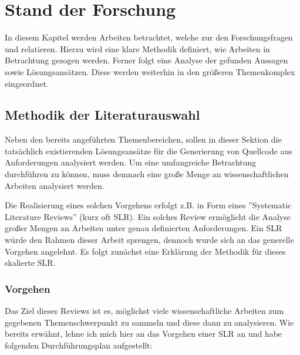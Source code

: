 \chapter{Stand der Forschung}\label{ch:Stand der Forschung}

In diesem Kapitel werden Arbeiten betrachtet, welche zur den Forschungsfragen  und  relatieren. Hierzu wird eine klare Methodik definiert, wie Arbeiten in Betrachtung gezogen werden. Ferner folgt eine Analyse der gefunden Aussagen sowie Lösungsansätzen. Diese werden weiterhin in den größeren Themenkomplex eingeordnet. 

\section{Methodik der Literaturauswahl}\label{ch:Methodik der Literaturauswahl}

Neben den bereits angeführten Themenbereichen, sollen in dieser Sektion die tatsächlich existierenden Lösungsansätze für die Generierung von Quellcode aus Anforderungen analysiert werden. Um eine umfangreiche Betrachtung durchführen zu können, muss demnach eine große Menge an wissenschaftlichen Arbeiten analysiert werden.

Die Realisierung eines solchen Vorgehens erfolgt z.B. in Form eines ''Systematic Literature Reviews''\cite{kitchenhamGuidelinesPerformingSystematic2007}  (kurz oft SLR). Ein solches Review ermöglicht die Analyse großer Mengen an Arbeiten unter genau definierten Anforderungen. Ein SLR würde den Rahmen dieser Arbeit sprengen, dennoch wurde sich an das generelle Vorgehen angelehnt. Es folgt zunächst eine Erklärung der Methodik für dieses skalierte SLR.

\subsection{Vorgehen}

Das Ziel dieses Reviews ist es, möglichst viele wissenschaftliche Arbeiten zum gegebenen Themenschwerpunkt zu sammeln und diese dann zu analysieren. Wie bereits erwähnt, lehne ich mich hier an das Vorgehen einer SLR\cite{kitchenhamGuidelinesPerformingSystematic2007} an und habe folgenden Durchführungsplan aufgestellt:

